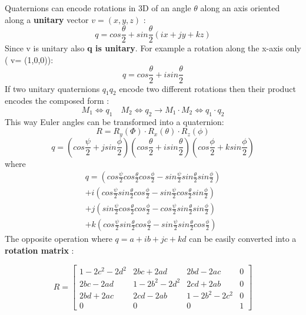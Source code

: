 Quaternions can encode rotations in 3D of an angle $\theta$ along an axis oriented along a \textbf{unitary} vector $v=(x,y,z)$ : 
\[
\boxed{q= cos \frac{\theta}{2} + sin \frac{\theta}{2} (ix+jy+kz)}
\]
Since v is unitary also \textbf{q is unitary}.
For example a rotation along the x-axis only ( v= (1,0,0)):
$$ q= cos \frac{\theta}{2} + isin \frac{\theta}{2} $$
If two unitary quaternions $q_1 q_2$ encode two different rotations  then their product encodes the composed form : $$ M_1 \Leftrightarrow q_1 \quad M_2 \Leftrightarrow q_2 \to M_1 \cdot M_2 \Leftrightarrow q_1 \cdot q_2$$
This way Euler angles can be transformed into a quaternion:
$$ R = R_y(\Phi) \cdot R_x(\theta) \cdot R_z(\phi)$$
\[
\boxed{q=\left( cos \frac{\psi}{2}+jsin \frac{\phi}{2}\right) \left( cos \frac{\theta}{2}+isin \frac{\theta}{2}\right)\left( cos \frac{\phi}{2}+ksin \frac{\phi}{2}\right)}
\]
where
\begin{align*}
q= \left( cos \frac{\psi}{2} cos \frac{\theta}{2} cos \frac{\phi}{2}- sin \frac{\psi}{2}sin \frac{\theta}{2} sin \frac{\phi}{2} \right) \\
+i\left( cos \frac{\psi}{2} sin \frac{\theta}{2} cos \frac{\phi}{2}- sin \frac{\psi}{2}cos \frac{\theta}{2}sin\frac{\phi}{2}\right) \\
+j \left( sin \frac{\psi}{2} cos \frac{\theta}{2} cos \frac{\phi}{2}- cos \frac{\psi}{2}sin \frac{\theta}{2}sin\frac{\phi}{2}\right)\\
+k \left( cos \frac{\psi}{2} sin \frac{\theta}{2} cos \frac{\phi}{2}- sin \frac{\psi}{2}sin \frac{\theta}{2}cos\frac{\phi}{2}\right)
\end{align*}
The opposite operation where $q=a+ib+jc+kd$ can be easily converted into a \textbf{rotation matrix} :

$$ R= \begin{bmatrix}
    1-2c^2-2d^2       & 2bc+2ad & 2bd-2ac  & 0 \\
    2bc-2ad      & 1-2b^2-2d^2 & 2cd+ 2ab & 0 \\
    2bd+2ac       & 2cd-2ab & 1-2b^2-2c^2 & 0 \\
    0 & 0 & 0 & 1 
\end{bmatrix}$$

